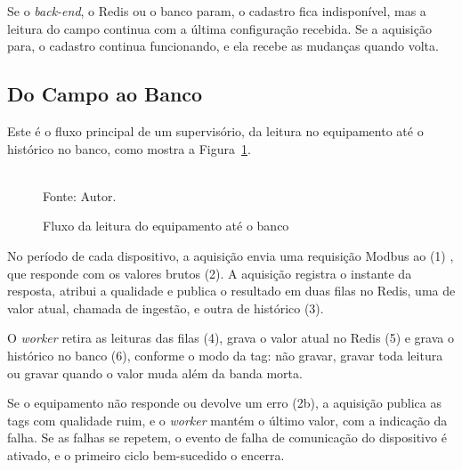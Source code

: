 \par Se o \emph{back-end}, o Redis ou o banco param, o cadastro fica indisponível, mas a leitura do campo continua com a última configuração recebida. Se a aquisição para, o cadastro continua funcionando, e ela recebe as mudanças quando volta.

\subsection{Do Campo ao Banco}

\par Este é o fluxo principal de um supervisório, da leitura no equipamento até o histórico no banco, como mostra a Figura~\ref{fig:fx_campo}.

\begin{figure}[H]
    \centering
    \caption{Fluxo da leitura do equipamento até o banco}
    \label{fig:fx_campo}
    \vspace{0.4cm}
    \vspace{0.2cm} \\
    Fonte: Autor.
\end{figure}

\par No período de cada dispositivo, a aquisição envia uma requisição Modbus ao  (1) \cite{MODBUS_TCP_IMPLEMENTATION_GUIDE}, que responde com os valores brutos (2). A aquisição registra o instante da resposta, atribui a qualidade e publica o resultado em duas filas no Redis, uma de valor atual, chamada de ingestão, e outra de histórico (3).

\par O \emph{worker} retira as leituras das filas (4), grava o valor atual no Redis (5) e grava o histórico no banco (6), conforme o modo da tag: não gravar, gravar toda leitura ou gravar quando o valor muda além da banda morta.

\par Se o equipamento não responde ou devolve um erro (2b), a aquisição publica as tags com qualidade ruim, e o \emph{worker} mantém o último valor, com a indicação da falha. Se as falhas se repetem, o evento de falha de comunicação do dispositivo é ativado, e o primeiro ciclo bem-sucedido o encerra.

